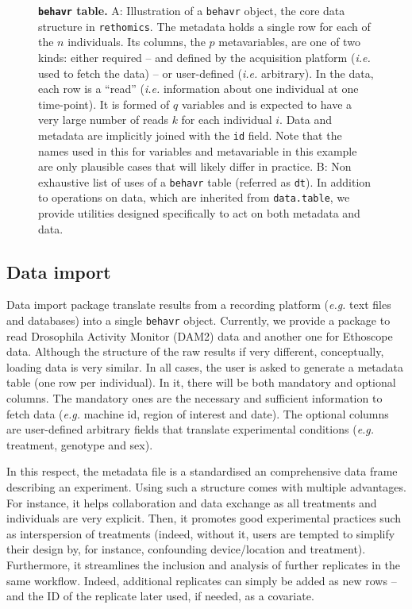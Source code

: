 \documentclass[10pt,letterpaper]{article}\usepackage[]{graphicx}\usepackage[]{color}
\begin{document}
\begin{figure}[!h]
	\caption{{\bf \texttt{behavr} table.}
	A: Illustration of a \texttt{behavr} object, the core data structure in \texttt{rethomics}.
		The metadata holds a single row for each of the $n$ individuals. 
		Its columns, the $p$ metavariables, are one of two kinds: either required -- and defined by the acquisition platform (\emph{i.e.} used to fetch the data) -- or user-defined (\emph{i.e.} arbitrary).
		In the data, each row is a ``read'' (\emph{i.e.} information about one individual at one time-point).
		It is formed of $q$ variables and is expected to have a very large number of reads $k$ for each individual $i$.
		Data and metadata are implicitly joined with the \texttt{id} field.
		Note that the names used in this for variables and metavariable in this example are only plausible cases that will likely differ in practice. 
		B: Non exhaustive list of uses of a \texttt{behavr} table (referred as \texttt{dt}). 
		In addition to operations on data, which are inherited from \texttt{data.table},
		we provide utilities designed specifically to act on both metadata and data.  
	}
	\label{fig:fig-2}
\end{figure}

\subsection*{Data import}
Data import package translate results from a recording platform (\emph{e.g.} text files and databases) into a single \texttt{behavr} object.
Currently, we provide a package to read Drosophila Activity Monitor (DAM2) data and another one for Ethoscope data\cite{geissmann_ethoscopes:_2017}.
Although the structure of the raw results if very different, conceptually, loading data is very similar.
In all cases, the user is asked to generate a metadata table (one row per individual). 
In it, there will be both mandatory and optional columns.
The mandatory ones are the necessary and sufficient information to fetch data (\emph{e.g.} machine id, region of interest and date). 
The optional columns are user-defined arbitrary fields that translate experimental conditions (\emph{e.g.} treatment, genotype and sex).

In this respect, the metadata file is a standardised an comprehensive data frame describing an experiment.
Using such a structure comes with multiple advantages.
For instance, it helps collaboration and data exchange as all treatments and individuals are very explicit.
Then, it promotes good experimental practices such as interspersion of treatments (indeed, without it, users are tempted to simplify their design by, for instance, confounding device/location and treatment).
Furthermore, it streamlines the inclusion and analysis of further replicates in the same workflow.
Indeed, additional replicates can simply be added as new rows -- and the ID of the replicate later used, if needed, as a covariate.	
\end{document}
